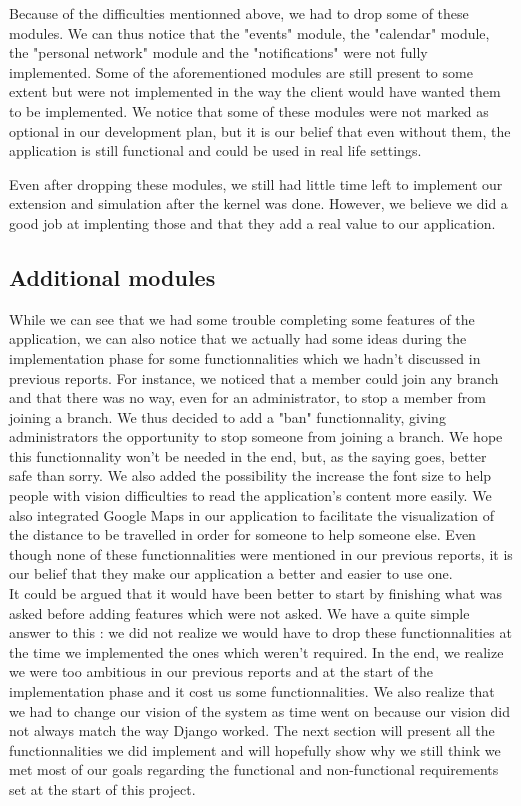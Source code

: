 \documentclass[11pt, a4paper]{article}      %
\begin{document}
Because of the difficulties mentionned above, we had to drop some of these modules. We can thus notice that the "events" module, the "calendar" module, the "personal network" module and the "notifications" were not fully implemented. Some of the aforementioned modules are still present to some extent but were not implemented in the way the client would have wanted them to be implemented. We notice that some of these modules were not marked as optional in our development plan, but it is our belief that even without them, the application is still functional and could be used in real life settings. 

Even after dropping these modules, we still had little time left to implement our extension and simulation after the kernel was done. However, we believe we did a good job at implenting those and that they add a real value to our application.

\subsection{Additional modules}
While we can see that we had some trouble completing some features of the application, we can also notice that we actually had some ideas during the implementation phase for some functionnalities which we hadn't discussed in previous reports. For instance, we noticed that a member could join any branch and that there was no way, even for an administrator, to stop a member from joining a branch. We thus decided to add a "ban" functionnality, giving administrators the opportunity to stop someone from joining a branch. We hope this functionnality won't be needed in the end, but, as the saying goes, better safe than sorry. We also added the possibility the increase the font size to help people with vision difficulties to read the application's content more easily.  We also integrated Google Maps in our application to facilitate the visualization of the distance to be travelled in order for someone to help someone else. Even though none of these functionnalities were mentioned in our previous reports, it is our belief that they make our application a better and easier to use one.\\

It could be argued that it would have been better to start by finishing what was asked before adding features which were not asked. We have a quite simple answer to this : we did not realize we would have to drop these functionnalities at the time we implemented the ones which weren't required. In the end, we realize we were too ambitious in our previous reports and at the start of the implementation phase and it cost us some functionnalities. We also realize that we had to change our vision of the system as time went on because our vision did not always match the way Django worked. The next section will present all the functionnalities we did implement and will hopefully show why we still think we met most of our goals regarding the functional and non-functional requirements set at the start of this project.
\end{document}

